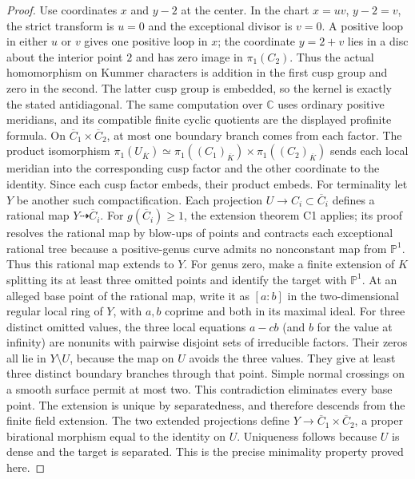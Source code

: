 \begin{proof}
Use coordinates $x$ and $y-2$ at the center. In the chart $x=uv$, $y-2=v$, the strict transform is $u=0$ and the exceptional divisor is $v=0$. A positive loop in either $u$ or $v$ gives one positive loop in $x$; the coordinate $y=2+v$ lies in a disc about the interior point $2$ and has zero image in $\pi_1(C_2)$. Thus the actual homomorphism on Kummer characters is addition in the first cusp group and zero in the second. The latter cusp group is embedded, so the kernel is exactly the stated antidiagonal. The same computation over $\mathbb C$ uses ordinary positive meridians, and its compatible finite cyclic quotients are the displayed profinite formula.
On $\overline C_1\times\overline C_2$, at most one boundary branch comes from each factor. The product isomorphism
$\pi_1(U_{\overline K})\simeq\pi_1((C_1)_{\overline K})\times\pi_1((C_2)_{\overline K})$
sends each local meridian into the corresponding cusp factor and the other coordinate to the identity. Since each cusp factor embeds, their product embeds.
For terminality let $Y$ be another such compactification. Each projection $U\to C_i\subset\overline C_i$ defines a rational map $Y\dashrightarrow\overline C_i$. For $g(\overline C_i)\ge1$, the extension theorem C1 applies; its proof resolves the rational map by blow-ups of points and contracts each exceptional rational tree because a positive-genus curve admits no nonconstant map from $\mathbb P^1$. Thus this rational map extends to $Y$. For genus zero, make a finite extension of $K$ splitting its at least three omitted points and identify the target with $\mathbb P^1$. At an alleged base point of the rational map, write it as $[a:b]$ in the two-dimensional regular local ring of $Y$, with $a,b$ coprime and both in its maximal ideal. For three distinct omitted values, the three local equations $a-cb$ (and $b$ for the value at infinity) are nonunits with pairwise disjoint sets of irreducible factors. Their zeros all lie in $Y\setminus U$, because the map on $U$ avoids the three values. They give at least three distinct boundary branches through that point. Simple normal crossings on a smooth surface permit at most two. This contradiction eliminates every base point. The extension is unique by separatedness, and therefore descends from the finite field extension. The two extended projections define $Y\to\overline C_1\times\overline C_2$, a proper birational morphism equal to the identity on $U$. Uniqueness follows because $U$ is dense and the target is separated. This is the precise minimality property proved here.
\end{proof}

